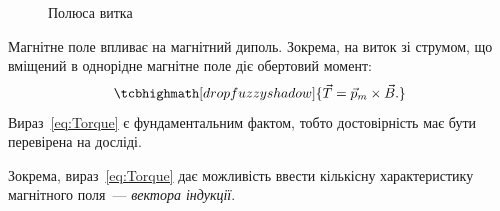 \documentclass{LabWorkTemplate}
\begin{document}
\begin{figure}\centering
{}
\caption{Полюса витка}
\label{pic:gimlet}
\end{figure}

Магнітне поле впливає на магнітний диполь. Зокрема, на виток зі струмом, що вміщений в однорідне магнітне поле діє обертовий момент:
\begin{equation}\label{eq:Torque}
	\tcbhighmath[drop fuzzy shadow]{
	\vec{T} = \vec{p}_m\times \vec{B}.
	}
\end{equation}
Вираз~\eqref{eq:Torque} є фундаментальним фактом, тобто достовірність має бути перевірена на досліді.

Зокрема, вираз~\eqref{eq:Torque} дає можливість ввести кількісну характеристику  магнітного поля~--- \emph{вектора індукції}.
\end{document}
